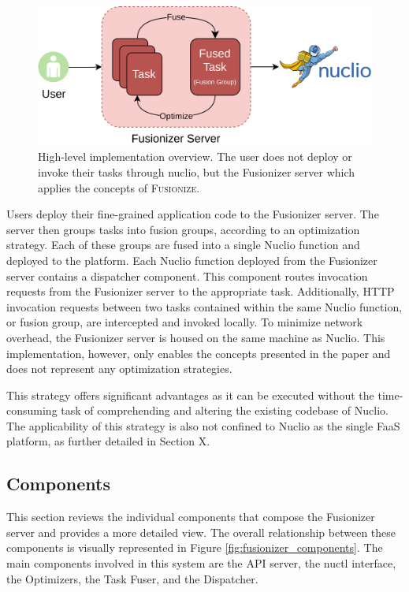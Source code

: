 \begin{figure}
    \centering
    \includegraphics[width=\linewidth]{figures/fusionizer_highlvl}
    \caption{
        High-level implementation overview. The user does not deploy or invoke
        their tasks through nuclio, but the Fusionizer server which applies the
        concepts of \textsc{Fusionize}.
    }
    \label{fig:fusionizer_highlvl}
\end{figure}

Users deploy their fine-grained application code to the Fusionizer server. The
server then groups tasks into fusion groups, according to an optimization
strategy. Each of these groups are fused into a single Nuclio function and
deployed to the platform. Each Nuclio function deployed from the Fusionizer
server contains a dispatcher component. This component routes invocation
requests from the Fusionizer server to the appropriate task. Additionally, HTTP
invocation requests between two tasks contained within the same Nuclio function,
or fusion group, are intercepted and invoked locally. To minimize network
overhead, the Fusionizer server is housed on the same machine as Nuclio. This
implementation, however, only enables the concepts presented in the paper and
does not represent any optimization strategies.

This strategy offers significant advantages as it can be executed without the
time-consuming task of comprehending and altering the existing codebase of
Nuclio. The applicability of this strategy is also not confined to Nuclio as the
single FaaS platform, as further detailed in Section X.

\subsection{Components}

This section reviews the individual components that compose the Fusionizer
server and provides a more detailed view. The overall relationship between these
components is visually represented in Figure \ref{fig:fusionizer_components}.
The main components involved in this system are the API server, the nuctl
interface, the Optimizers, the Task Fuser, and the Dispatcher.

